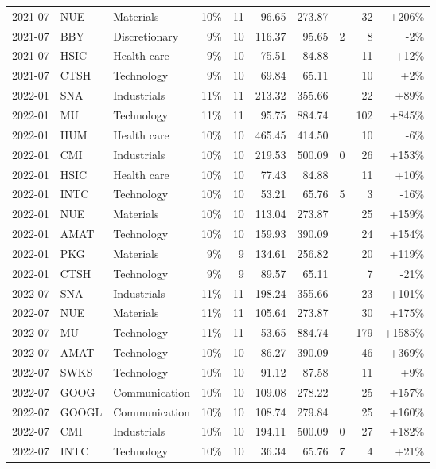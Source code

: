 \documentclass[11pt,a4paper]{article}
\begin{document}
{\begin{longtable}{l l l r r r r r r r}
2021-07 & NUE & Materials & 10\% & 11 & 96.65 & 273.87 &  & 32 & +206\% \\
2021-07 & BBY & Discretionary & 9\% & 10 & 116.37 & 95.65 & 2 & 8 & -2\% \\
2021-07 & HSIC & Health care & 9\% & 10 & 75.51 & 84.88 &  & 11 & +12\% \\
2021-07 & CTSH & Technology & 9\% & 10 & 69.84 & 65.11 &  & 10 & +2\% \\
2022-01 & SNA & Industrials & 11\% & 11 & 213.32 & 355.66 &  & 22 & +89\% \\
2022-01 & MU & Technology & 11\% & 11 & 95.75 & 884.74 &  & 102 & +845\% \\
2022-01 & HUM & Health care & 10\% & 10 & 465.45 & 414.50 &  & 10 & -6\% \\
2022-01 & CMI & Industrials & 10\% & 10 & 219.53 & 500.09 & 0 & 26 & +153\% \\
2022-01 & HSIC & Health care & 10\% & 10 & 77.43 & 84.88 &  & 11 & +10\% \\
2022-01 & INTC & Technology & 10\% & 10 & 53.21 & 65.76 & 5 & 3 & -16\% \\
2022-01 & NUE & Materials & 10\% & 10 & 113.04 & 273.87 &  & 25 & +159\% \\
2022-01 & AMAT & Technology & 10\% & 10 & 159.93 & 390.09 &  & 24 & +154\% \\
2022-01 & PKG & Materials & 9\% & 9 & 134.61 & 256.82 &  & 20 & +119\% \\
2022-01 & CTSH & Technology & 9\% & 9 & 89.57 & 65.11 &  & 7 & -21\% \\
2022-07 & SNA & Industrials & 11\% & 11 & 198.24 & 355.66 &  & 23 & +101\% \\
2022-07 & NUE & Materials & 11\% & 11 & 105.64 & 273.87 &  & 30 & +175\% \\
2022-07 & MU & Technology & 11\% & 11 & 53.65 & 884.74 &  & 179 & +1585\% \\
2022-07 & AMAT & Technology & 10\% & 10 & 86.27 & 390.09 &  & 46 & +369\% \\
2022-07 & SWKS & Technology & 10\% & 10 & 91.12 & 87.58 &  & 11 & +9\% \\
2022-07 & GOOG & Communication & 10\% & 10 & 109.08 & 278.22 &  & 25 & +157\% \\
2022-07 & GOOGL & Communication & 10\% & 10 & 108.74 & 279.84 &  & 25 & +160\% \\
2022-07 & CMI & Industrials & 10\% & 10 & 194.11 & 500.09 & 0 & 27 & +182\% \\
2022-07 & INTC & Technology & 10\% & 10 & 36.34 & 65.76 & 7 & 4 & +21\% \\

\end{longtable}}
\end{document}
